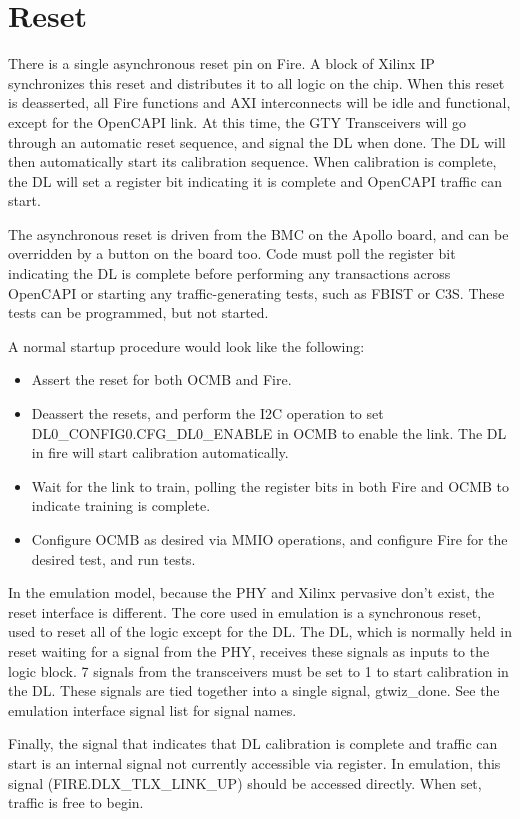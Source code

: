 \section{Reset} \label{section_reset}

There is a single asynchronous reset pin on Fire. A block of Xilinx IP
synchronizes this reset and distributes it to all logic on the
chip. When this reset is deasserted, all Fire functions and AXI
interconnects will be idle and functional, except for the OpenCAPI
link. At this time, the GTY Transceivers will go through an automatic
reset sequence, and signal the DL when done. The DL will then
automatically start its calibration sequence. When calibration is
complete, the DL will set a register bit indicating it is complete and
OpenCAPI traffic can start.

The asynchronous reset is driven from the BMC on the Apollo board, and
can be overridden by a button on the board too. Code must poll the
register bit indicating the DL is complete before performing any
transactions across OpenCAPI or starting any traffic-generating tests,
such as FBIST or C3S. These tests can be programmed, but not started.

A normal startup procedure would look like the following:

\begin{itemize}

\item
  Assert the reset for both OCMB and Fire.

\item
  Deassert the resets, and perform the I2C operation to set
  DL0\_CONFIG0.CFG\_DL0\_ENABLE in OCMB to enable the link. The DL in
  fire will start calibration automatically.

\item
  Wait for the link to train, polling the register bits in both Fire
  and OCMB to indicate training is complete.

\item
  Configure OCMB as desired via MMIO operations, and configure Fire
  for the desired test, and run tests.

\end{itemize}

\begin{emulation}
  In the emulation model, because the PHY and Xilinx pervasive don't
  exist, the reset interface is different. The core used in emulation
  is a synchronous reset, used to reset all of the logic except for
  the DL. The DL, which is normally held in reset waiting for a signal
  from the PHY, receives these signals as inputs to the logic block. 7
  signals from the transceivers must be set to 1 to start calibration
  in the DL. These signals are tied together into a single signal,
  gtwiz\_done. See the emulation interface signal list for signal
  names.

  Finally, the signal that indicates that DL calibration is complete
  and traffic can start is an internal signal not currently accessible
  via register. In emulation, this signal (FIRE.DLX\_TLX\_LINK\_UP)
  should be accessed directly. When set, traffic is free to begin.

\end{emulation}
